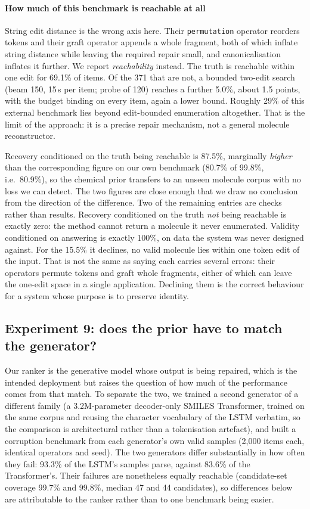 \documentclass[conference]{IEEEtran}
\begin{document}
\paragraph{How much of this benchmark is reachable at all}
String edit distance is the wrong axis here. Their \texttt{permutation} operator
reorders tokens and their graft operator appends a whole fragment, both of which
inflate string distance while leaving the required repair small, and
canonicalisation inflates it further. We report \emph{reachability} instead. The truth is reachable within one edit for 69.1\% of items. Of the 371
that are not, a bounded two-edit search (beam 150, 15\,s per item; probe of 120)
reaches a further 5.0\%, about 1.5 points, with the budget binding on every
item, again a lower bound. Roughly 29\% of this external benchmark lies beyond
edit-bounded enumeration altogether. That is the limit of the approach: it is a
precise repair mechanism, not a general molecule reconstructor.

\noindent
Recovery conditioned on the truth being reachable is 87.5\%, marginally
\emph{higher} than the corresponding figure on our own benchmark (80.7\% of
99.8\%, i.e.\ 80.9\%), so the chemical prior transfers to an unseen molecule
corpus with no loss we can detect. The two figures are close enough that we
draw no conclusion from the direction of the difference. Two of the remaining entries are checks rather than
results. Recovery conditioned on the truth \emph{not} being reachable is exactly
zero: the method cannot return a molecule it never enumerated. Validity
conditioned on answering is exactly 100\%, on data the system was never designed
against. For the 15.5\% it declines, no valid molecule lies within one token
edit of the input. That is not the same as saying each carries several errors:
their operators permute tokens and graft whole fragments, either of which can
leave the one-edit space in a single application. Declining them is the correct
behaviour for a system whose purpose is to preserve identity.

\subsection{Experiment 9: does the prior have to match the generator?}\label{sec:exp9}

Our ranker is the generative model whose output is being repaired, which is the
intended deployment but raises the question of how much of the performance comes
from that match. To separate the two, we trained a second generator of a
different family (a 3.2M-parameter decoder-only SMILES Transformer, trained on
the same corpus and reusing the character vocabulary of the LSTM verbatim, so
the comparison is architectural rather than a tokenisation artefact), and built a
corruption benchmark from each generator's own valid samples (2{,}000 items
each, identical operators and seed). The two generators differ substantially in
how often they fail: 93.3\% of the LSTM's samples parse, against 83.6\% of the
Transformer's. Their failures are nonetheless equally reachable (candidate-set
coverage 99.7\% and 99.8\%, median 47 and 44 candidates), so differences below
are attributable to the ranker rather than to one benchmark being easier.
\end{document}
